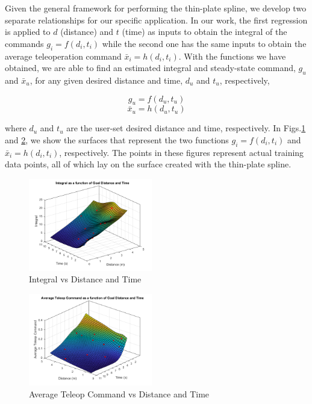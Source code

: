 \documentclass[letterpaper, 10 pt, conference]{ieeeconf}  %
\newcommand\NB[1]{$\spadesuit$\footnote{NB: #1}}
\begin{document}
Given the general framework for performing the thin-plate spline, we develop two separate relationships for our specific application. In our work, the first regression is applied to $d$ (distance) and $t$ (time) as inputs to obtain the integral of the commands $g_i = f(d_i,t_i)$ while the second one has the same inputs to obtain the average teleoperation command $\bar{x}_i = h(d_i,t_i)$. With the functions we have obtained, we are able to find an estimated integral and steady-state command, $g_u$ and $\bar{x}_u$, for any given desired distance and time, $d_u$ and $t_u$, respectively,

\begin{equation} \label{eq:integralfit}
g_u = f(d_u,t_u)
\end{equation}
\begin{equation} \label{eq:ssvelfit}
\bar{x}_u = h(d_u,t_u)
\end{equation}

where $d_u$ and $t_u$ are the user-set desired distance and time, respectively. In Figs.\ref{fig:integs} and \ref{fig:joys}, we show the surfaces that represent the two functions $g_i = f(d_i,t_i)$ and $\bar{x}_i = h(d_i,t_i)$, respectively. The points in these figures represent actual training data points, all of which lay on the surface created with the thin-plate spline.

\begin{figure}[ht]
    \includegraphics[width=0.48\textwidth]{images/integs.png}
    \caption{Integral vs Distance and Time}
    \label{fig:integs}
\end{figure}
\begin{figure}[ht]
    \includegraphics[width=0.48\textwidth]{images/joycmds.png}
    \caption{Average Teleop Command vs Distance and Time}
    \label{fig:joys}
\end{figure}
\end{document}
